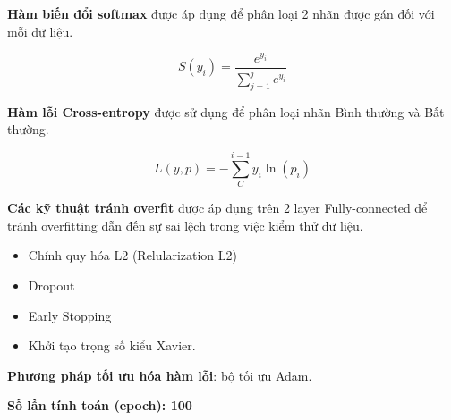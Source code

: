 \textbf{Hàm biến đổi softmax} được áp dụng để phân loại 2 nhãn được gán đối với mỗi dữ liệu.

\begin{equation}
    S(y_i) = \frac{e^{y_i}}{\sum_{j=1}^{j}e^{y_i}}   
\end{equation}

\textbf{Hàm lỗi Cross-entropy} được sử dụng để phân loại nhãn Bình thường và Bất thường.

\begin{equation}
    L(y,p) = -\sum_{C}^{i=1}y_i\ln(p_i)
\end{equation}

\textbf{Các kỹ thuật tránh overfit} được áp dụng trên 2 layer Fully-connected để tránh overfitting dẫn đến sự sai lệch trong việc kiểm thử dữ liệu.
\begin{itemize}
    \item Chính quy hóa L2 (Relularization L2)
    \item Dropout
    \item Early Stopping
    \item Khởi tạo trọng số kiểu Xavier.
\end{itemize}

\textbf{Phương pháp tối ưu hóa hàm lỗi}: bộ tối ưu Adam.

\textbf{Số lần tính toán (epoch): 100}
